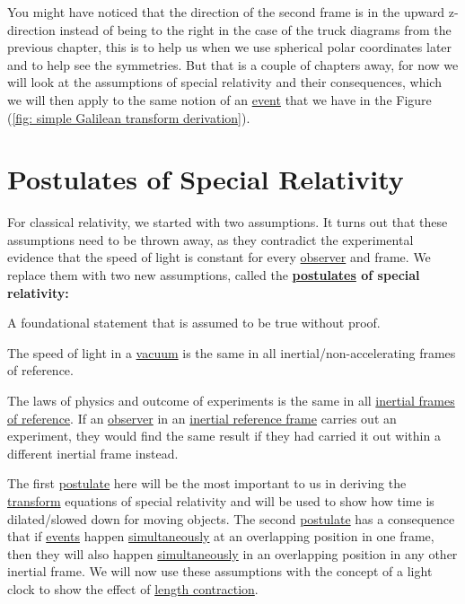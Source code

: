 You might have noticed that the direction of the second frame is in the upward z-direction instead of being to the right in the case of the truck diagrams from the previous chapter, this is to help us when we use spherical polar coordinates later and to help see the symmetries. But that is a couple of chapters away, for now we will look at the assumptions of special relativity and their consequences, which we will then apply to the same notion of an \hyperlink{def-event}{event} that we have in the Figure (\ref{fig: simple Galilean transform derivation}).

\section{Postulates of Special Relativity} \label{sect: Postulates of Special Relativity}

For classical relativity, we started with two assumptions. It turns out that these assumptions need to be thrown away, as they contradict the experimental evidence that the speed of light is constant for every \hyperlink{def-observer}{observer} and frame. We replace them with two new assumptions, called the \textbf{\hyperlink{def-postulates}{postulates} of special relativity:}

A foundational statement that is assumed to be true without proof.

\begin{mainpoints}
	\item The speed of light in a \hyperlink{def-vacuum}{vacuum} is the same in all inertial/non-accelerating frames of reference.
	\item The laws of physics and outcome of experiments is the same in all \hyperlink{def-Inertial-reference-frame}{inertial frames of reference}. If an \hyperlink{def-observer}{observer} in an \hyperlink{def-Inertial-reference-frame}{inertial reference frame} carries out an experiment, they would find the same result if they had carried it out within a different inertial frame instead.
\end{mainpoints}

The first \hyperlink{def-postulates}{postulate} here will be the most important to us in deriving the \hyperlink{def-transform}{transform} equations of special relativity and will be used to show how time is dilated/slowed down for moving objects. The second \hyperlink{def-postulates}{postulate} has a consequence that if \hyperlink{def-event}{events} happen \hyperlink{def-simultaneity}{simultaneously} at an overlapping position in one frame, then they will also happen \hyperlink{def-simultaneity}{simultaneously} in an overlapping position in any other inertial frame.
We will now use these assumptions with the concept of a light clock to show the effect of \hyperlink{def-length-contraction}{length contraction}.

